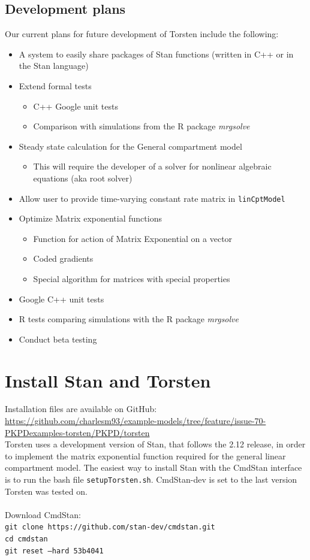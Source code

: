 \documentclass[11pt]{amsart}
\let\oldsection\section
\renewcommand\section{\clearpage\oldsection}
\begin{document}
\subsection*{Development plans} Our current plans for future development of Torsten include the following:
\begin{itemize}
  \item A system to easily share packages of Stan functions (written in C++ or in the Stan language)
  \item Extend formal tests
  \begin{itemize}
    \item C++ Google unit tests
    \item Comparison with simulations from the R package \textit{mrgsolve}
  \end{itemize}
  \item Steady state calculation for the General compartment model
  \begin{itemize}
    \item This will require the developer of a solver for nonlinear algebraic equations (aka root solver)
  \end{itemize}
  \item Allow user to provide time-varying constant rate matrix in \texttt{linCptModel}
  \item Optimize Matrix exponential functions
  \begin{itemize}
    \item Function for action of Matrix Exponential on a vector
    \item Coded gradients
    \item Special algorithm for matrices with special properties
  \end{itemize}
  \item Google C++ unit tests
  \item R tests comparing simulations with the R package \textit{mrgsolve}
  \item Conduct beta testing
\end{itemize}

\section{Install Stan and Torsten}    
Installation files are available on GitHub: \url{https://github.com/charlesm93/example-models/tree/feature/issue-70-PKPDexamples-torsten/PKPD/torsten} \\
Torsten uses a development version of Stan, that follows the 2.12 release, in order to implement the matrix exponential function required for the general linear compartment model. The easiest way to install Stan with the CmdStan interface is to run the bash file \texttt{setupTorsten.sh}. CmdStan-dev is set to the last version Torsten was tested on. \\ \\
Download CmdStan: \\
\texttt{git clone https://github.com/stan-dev/cmdstan.git \\
cd cmdstan \\
git reset --hard 53b4041} \\
\end{document}
